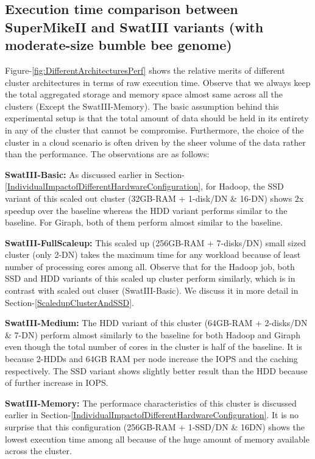 \documentclass[conference]{IEEEtran}
\begin{document}
\subsection {Execution time comparison between SuperMikeII and SwatIII variants (with moderate-size bumble bee genome)} \label{ExecutionTimeDiffArchBumblebee}
Figure-\ref{fig:DifferentArchitecturesPerf} shows the relative merits of different cluster architectures in terms of raw execution time. Observe that we always keep the total aggregated storage and memory space almost same across all the clusters (Except the SwatIII-Memory). The basic assumption behind this experimental setup is that the total amount of data should be held in its entirety in any of the cluster that cannot be compromise. Furthermore, the choice of the cluster in a cloud scenario is often driven by the sheer volume of the data rather than the performance. The observations are as follows:
\begin{inparaenum}[\itshape 1\upshape)]
\item \textbf{SwatIII-Basic:} As discussed earlier in Section-\ref{IndividualImpactofDifferentHardwareConfiguration}, for Hadoop, the SSD variant of this scaled out cluster (32GB-RAM + 1-disk/DN \& 16-DN) shows $2$x speedup over the baseline whereas the HDD variant performs similar to the baseline. For Giraph, both of them perform almost similar to the baseline.
\item \textbf{SwatIII-FullScaleup:} This scaled up (256GB-RAM + 7-disks/DN) small sized cluster (only 2-DN) takes the maximum time for any workload because of least number of processing cores among all. Observe that for the Hadoop job, both SSD and HDD variants of this scaled up cluster perform similarly, which is in contrast with scaled out cluser (SwatIII-Basic). We discuss it in more detail in Section-\ref{ScaledupClusterAndSSD}.
\item \textbf{SwatIII-Medium:} The HDD variant of this cluster (64GB-RAM + 2-disks/DN \& 7-DN) perform almost similarly to the baseline for both Hadoop and Giraph even though the total number of cores in the cluster is half of the baseline. It is because 2-HDDs and 64GB RAM per node increase the IOPS and the caching respectively. The SSD variant shows slightly better result than the HDD because of further increase in IOPS.
\item \textbf{SwatIII-Memory:} The performace characteristics of this cluster is discussed earlier in Section-\ref{IndividualImpactofDifferentHardwareConfiguration}. 
It is no surprise that this configuration (256GB-RAM + 1-SSD/DN \& 16DN) shows the lowest execution time among all because of the huge amount of memory available across the cluster.
\end{inparaenum}
\end{document}
